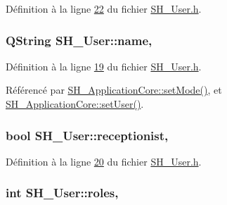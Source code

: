 Définition à la ligne \hyperlink{SH__User_8h_source_l00022}{22} du fichier \hyperlink{SH__User_8h_source}{S\-H\-\_\-\-User.\-h}.

\hypertarget{classSH__User_a18a7ad8ceded0edd3cb93e36cfcd2099}{
\subsubsection[{name}]{\setlength{\rightskip}{0pt plus 5cm}Q\-String S\-H\-\_\-\-User\-::name\hspace{0.3cm}{\ttfamily [read]}, {\ttfamily [inherited]}}}\label{classSH__User_a18a7ad8ceded0edd3cb93e36cfcd2099}


Définition à la ligne \hyperlink{SH__User_8h_source_l00019}{19} du fichier \hyperlink{SH__User_8h_source}{S\-H\-\_\-\-User.\-h}.



Référencé par \hyperlink{classSH__ApplicationCore_aeb87d289ccc9c8209928f23cf8a02ead}{S\-H\-\_\-\-Application\-Core\-::set\-Mode()}, et \hyperlink{classSH__ApplicationCore_a83d2df40550a95586e70a08833dc5e5f}{S\-H\-\_\-\-Application\-Core\-::set\-User()}.

\hypertarget{classSH__User_ad9970fff1a6be03101fd87f9c60081ee}{
\subsubsection[{receptionist}]{\setlength{\rightskip}{0pt plus 5cm}bool S\-H\-\_\-\-User\-::receptionist\hspace{0.3cm}{\ttfamily [read]}, {\ttfamily [inherited]}}}\label{classSH__User_ad9970fff1a6be03101fd87f9c60081ee}


Définition à la ligne \hyperlink{SH__User_8h_source_l00020}{20} du fichier \hyperlink{SH__User_8h_source}{S\-H\-\_\-\-User.\-h}.

\hypertarget{classSH__User_a4ccfdedef6ae4f0cf0345a7bfa306e9c}{
\subsubsection[{roles}]{\setlength{\rightskip}{0pt plus 5cm}int S\-H\-\_\-\-User\-::roles\hspace{0.3cm}{\ttfamily [read]}, {\ttfamily [inherited]}}}\label{classSH__User_a4ccfdedef6ae4f0cf0345a7bfa306e9c}


